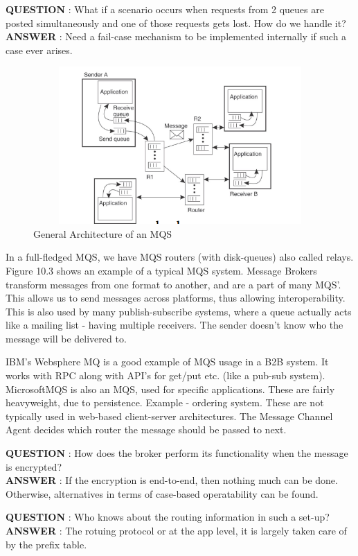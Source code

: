 \documentclass[twoside]{article}
\begin{document}
\textbf{QUESTION} : What if a scenario occurs when requests from 2 queues are posted simultaneously and one of those requests gets lost. How do we handle it?\\ 
\textbf{ANSWER} : Need a fail-case mechanism to be implemented internally if such a case ever arises.

\begin{figure}
\includegraphics[width=12cm, height=6cm]{Selection_005}
\centering
\caption{General Architecture of an MQS}
\end{figure}

In a full-fledged MQS, we have MQS routers (with disk-queues) also called relays. Figure 10.3 shows an example of a typical MQS system. Message Brokers transform messages from one format to another, and are a part of many MQS'. This allows us to send messages across platforms, thus allowing interoperability. This is also used by many publish-subscribe systems, where a queue actually acts like a mailing list - having multiple receivers. The sender doesn't know who the message will be delivered to. 

IBM's Websphere MQ is a good example of MQS usage in a B2B system. It works with RPC along with API's for get/put etc. (like a pub-sub system). MicrosoftMQS is also an MQS, used for specific applications. These are fairly heavyweight, due to persistence. Example - ordering system. These are not typically used in web-based client-server architectures. The Message Channel Agent decides which router the message should be passed to next.

\textbf{QUESTION} : How does the broker perform its functionality when the message is encrypted?\\
\textbf{ANSWER} : If the encryption is end-to-end, then nothing much can be done. Otherwise, alternatives in terms of case-based operatability can be found.

\textbf{QUESTION} : Who knows about the routing information in such a set-up?\\
\textbf{ANSWER} : The rotuing protocol or at the app level, it is largely taken care of by the prefix table.
\end{document}

